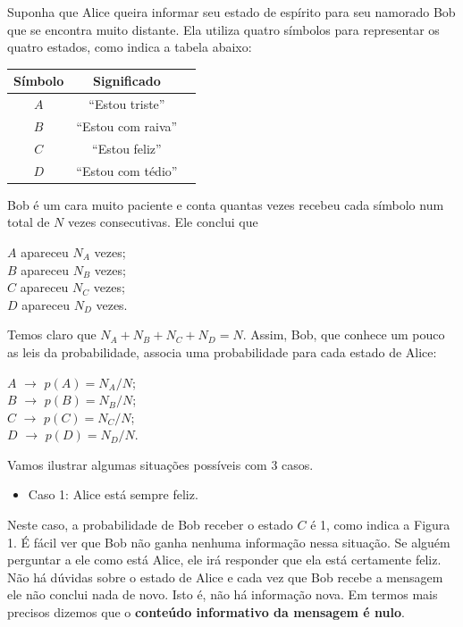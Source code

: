 \documentclass{article}
\begin{document}
Suponha que Alice queira informar seu estado de espírito para seu namorado Bob que se encontra muito distante. Ela utiliza quatro símbolos para representar os quatro estados, como indica a tabela abaixo:
\begin{center}
\begin{tabular}{ |c|c|c| } 
\hline
Símbolo & Significado \\
\hline
$A$ & ``Estou triste''  \\ 
$B$ & ``Estou com raiva'' \\ 
$C$ & ``Estou feliz'' \\
$D$ & ``Estou com tédio'' \\
\hline
\end{tabular}
\end{center}
Bob é um cara muito paciente e conta quantas vezes recebeu cada símbolo num total de $N$ vezes consecutivas. Ele conclui que
\begin{center}
    $A$ apareceu $N_A$ vezes; \\
    $B$ apareceu $N_B$ vezes; \\
    $C$ apareceu $N_C$ vezes; \\
    $D$ apareceu $N_D$ vezes. \\
\end{center}
Temos claro que $N_A + N_B + N_C + N_D = N$. Assim, Bob, que conhece um pouco as leis da probabilidade, associa uma probabilidade para cada estado de Alice:
\begin{center}
    $A$ $\rightarrow$ $p(A) = N_A/N$; \\
    $B$ $\rightarrow$ $p(B) = N_B/N$; \\
    $C$ $\rightarrow$ $p(C) = N_C/N$; \\
    $D$ $\rightarrow$ $p(D) = N_D/N$. \\
\end{center}
Vamos ilustrar algumas situações possíveis com 3 casos.
\begin{itemize}
    \item Caso 1: Alice está sempre feliz.
\end{itemize}
Neste caso, a probabilidade de Bob receber o estado $C$ é 1, como indica a Figura 1. É fácil ver que Bob não ganha nenhuma informação nessa situação. Se alguém perguntar a ele como está Alice, ele irá responder que ela está certamente feliz. Não há dúvidas sobre o estado de Alice e cada vez que Bob recebe a mensagem ele não conclui nada de novo. Isto é, não há informação nova. Em termos mais precisos dizemos que o \textbf{conteúdo informativo da mensagem é nulo}.
\end{document}
